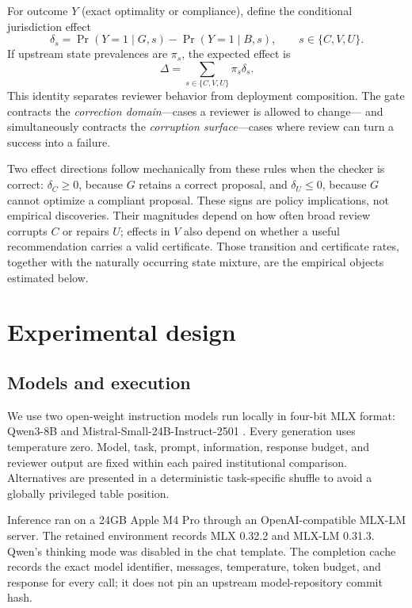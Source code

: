 \documentclass[10pt]{article}
\begin{document}
For outcome $Y$ (exact optimality or compliance), define the conditional
jurisdiction effect
\begin{equation}
 \delta_s = \Pr(Y=1\mid G,s)-\Pr(Y=1\mid B,s),\qquad s\in\{C,V,U\}.
\end{equation}
If upstream state prevalences are $\pi_s$, the expected effect is
\begin{equation}\label{eq:mixture}
 \Delta = \sum_{s\in\{C,V,U\}} \pi_s\delta_s.
\end{equation}
This identity separates reviewer behavior from deployment composition. The gate
contracts the \emph{correction domain}---cases a reviewer is allowed to change---
and simultaneously contracts the \emph{corruption surface}---cases where review
can turn a success into a failure.

Two effect directions follow mechanically from these rules when the checker is
correct: $\delta_C\geq0$, because $G$ retains a correct proposal, and
$\delta_U\leq0$, because $G$ cannot optimize a compliant proposal. These signs
are policy implications, not empirical discoveries. Their magnitudes depend on
how often broad review corrupts $C$ or repairs $U$; effects in $V$ also depend on
whether a useful recommendation carries a valid certificate. Those transition
and certificate rates, together with the naturally occurring state mixture, are
the empirical objects estimated below.

\section{Experimental design}

\subsection{Models and execution}

We use two open-weight instruction models run locally in four-bit MLX format:
Qwen3-8B \cite{yang2025qwen3,mlxcommunity2025qwen3} and
Mistral-Small-24B-Instruct-2501
\cite{mistral2025small,mlxcommunity2025mistral}. Every generation uses
temperature zero. Model, task,
prompt, information, response budget, and reviewer output are fixed within each
paired institutional comparison. Alternatives are presented in a deterministic
task-specific shuffle to avoid a globally privileged table position.

Inference ran on a 24GB Apple M4 Pro through an OpenAI-compatible MLX-LM
server. The retained environment records MLX 0.32.2 and MLX-LM 0.31.3. Qwen's
thinking mode was disabled in the chat template. The completion cache records
the exact model identifier, messages, temperature, token budget, and response
for every call; it does not pin an upstream model-repository commit hash.
\end{document}
